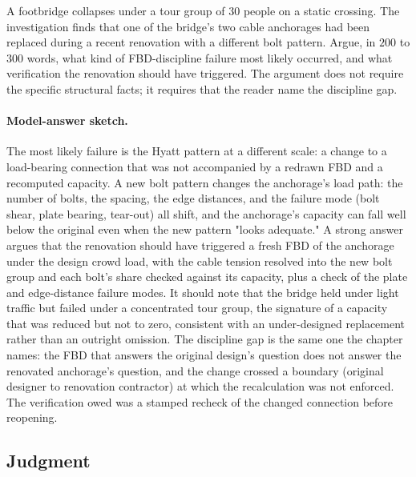 \begin{exercise}
A footbridge collapses under a tour group of $30$ people on a static
crossing. The investigation finds that one of the bridge's two cable
anchorages had been replaced during a recent renovation with a
different bolt pattern. Argue, in $200$ to $300$ words, what kind
of FBD-discipline failure most likely occurred, and what verification
the renovation should have triggered. The argument does not require
the specific structural facts; it requires that the reader name the
discipline gap.
\paragraph{Model-answer sketch.} The most likely failure is the Hyatt
pattern at a different scale: a change to a load-bearing connection that
was not accompanied by a redrawn FBD and a recomputed capacity. A new
bolt pattern changes the anchorage's load path: the number of bolts, the
spacing, the edge distances, and the failure mode (bolt shear, plate
bearing, tear-out) all shift, and the anchorage's capacity can fall well
below the original even when the new pattern "looks adequate." A strong
answer argues that the renovation should have triggered a fresh FBD of
the anchorage under the design crowd load, with the cable tension
resolved into the new bolt group and each bolt's share checked against
its capacity, plus a check of the plate and edge-distance failure modes.
It should note that the bridge held under light traffic but failed under
a concentrated tour group, the signature of a capacity that was reduced
but not to zero, consistent with an under-designed replacement rather
than an outright omission. The discipline gap is the same one the
chapter names: the FBD that answers the original design's question does
not answer the renovated anchorage's question, and the change crossed a
boundary (original designer to renovation contractor) at which the
recalculation was not enforced. The verification owed was a stamped
recheck of the changed connection before reopening.
\end{exercise}

\subsection*{Judgment}

